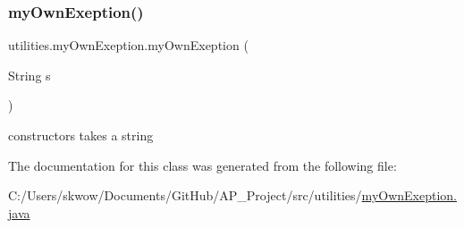 \subsubsection{\texorpdfstring{my\+Own\+Exeption()}{myOwnExeption()}}
{\footnotesize\ttfamily utilities.\+my\+Own\+Exeption.\+my\+Own\+Exeption (\begin{DoxyParamCaption}\item[{String}]{s }\end{DoxyParamCaption})}



constructors takes a string 



The documentation for this class was generated from the following file\+:\begin{DoxyCompactItemize}
\item 
C\+:/\+Users/skwow/\+Documents/\+Git\+Hub/\+A\+P\+\_\+\+Project/src/utilities/\hyperlink{my_own_exeption_8java}{my\+Own\+Exeption.\+java}\end{DoxyCompactItemize}
